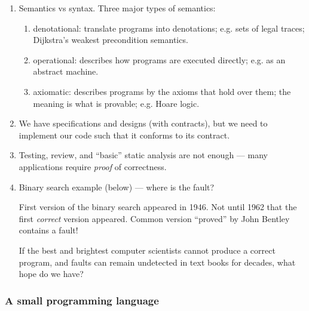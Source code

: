\documentclass[11pt]{article}
\begin{document}
\begin{enumerate}

 \item Semantics vs syntax. Three major types of semantics: 

 \begin{enumerate}

   \item denotational: translate programs into denotations; e.g. sets of legal traces; Dijkstra's weakest precondition semantics.

   \item operational: describes how programs are executed directly; e.g. as an abstract machine.

   \item axiomatic: describes programs by the axioms that hold over them; the meaning is what is provable; e.g. Hoare logic.

 \end{enumerate}

 \item We have specifications and designs (with contracts), but we need to implement our code such that it conforms to its contract.

 \item Testing, review, and ``basic'' static analysis are not enough --- many applications require \emph{proof} of correctness.

 \item Binary search example (below) --- where is the fault?

  First version of the binary search  appeared in 1946.  Not until 1962 that the first {\em correct} version appeared. Common version ``proved'' by John Bentley contains a fault!

 If the best and brightest computer scientists cannot produce a correct program, and faults can remain undetected in text books for decades, what hope do we have?

\end{enumerate}

\subsubsection*{A small programming language}
\end{document}
